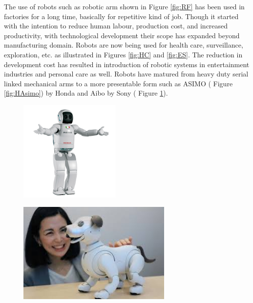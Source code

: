 The use of robots such as robotic arm shown in Figure \ref{fig:RF} has been used in factories for a long time, basically for repetitive kind  of job. Though it started with the intention to reduce human labour, production cost, and increased productivity, with technological development  their scope has expanded beyond  manufacturing domain. Robots are now being used for health care, surveillance, exploration, etc. as illustrated in Figures \ref{fig:HC} and \ref{fig:ES}. The reduction in development cost  has resulted in introduction of robotic systems in entertainment industries and personal care as well. Robots have matured from heavy duty serial linked mechanical arms to a more presentable form such as ASIMO ( Figure \ref{fig:HAsimo}) by Honda and Aibo by Sony  ( Figure \ref{fig:SA}).  
\begin{figure}
	\centering
	\begin{minipage}{.5\textwidth}
		\centering
		\includegraphics[height=5cm,keepaspectratio]{Chapter1/fig/Honda-Asimo}
		\label{fig:HAsimo}
	\end{minipage}%
	\begin{minipage}{.5\textwidth}
		\centering
		\includegraphics[width=.8\linewidth,height=5cm,keepaspectratio]{Chapter1/fig/aibo}
		\label{fig:SA}
	\end{minipage}
\end{figure}

